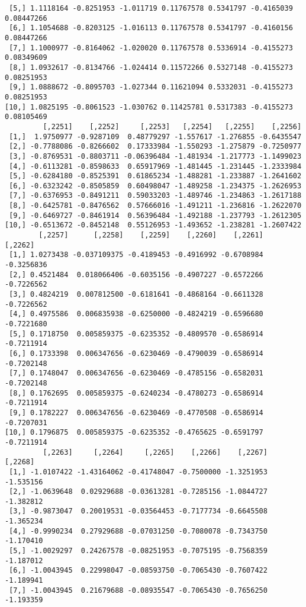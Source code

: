 \documentclass[
  letterpaper,
  DIV=11,
  numbers=noendperiod]{scrreprt}
\begin{document}
\begin{verbatim}
 [5,] 1.1118164 -0.8251953 -1.011719 0.11767578 0.5341797 -0.4165039 0.08447266
 [6,] 1.1054688 -0.8203125 -1.016113 0.11767578 0.5341797 -0.4160156 0.08447266
 [7,] 1.1000977 -0.8164062 -1.020020 0.11767578 0.5336914 -0.4155273 0.08349609
 [8,] 1.0932617 -0.8134766 -1.024414 0.11572266 0.5327148 -0.4155273 0.08251953
 [9,] 1.0888672 -0.8095703 -1.027344 0.11621094 0.5332031 -0.4155273 0.08251953
[10,] 1.0825195 -0.8061523 -1.030762 0.11425781 0.5317383 -0.4155273 0.08105469
         [,2251]    [,2252]     [,2253]   [,2254]   [,2255]    [,2256]
 [1,]  1.9750977 -0.9287109  0.48779297 -1.557617 -1.276855 -0.6435547
 [2,] -0.7788086 -0.8266602  0.17333984 -1.550293 -1.275879 -0.7250977
 [3,] -0.8769531 -0.8803711 -0.06396484 -1.481934 -1.217773 -1.1499023
 [4,] -0.6113281 -0.8598633  0.65917969 -1.481445 -1.231445 -1.2333984
 [5,] -0.6284180 -0.8525391  0.61865234 -1.488281 -1.233887 -1.2641602
 [6,] -0.6323242 -0.8505859  0.60498047 -1.489258 -1.234375 -1.2626953
 [7,] -0.6376953 -0.8491211  0.59033203 -1.489746 -1.234863 -1.2617188
 [8,] -0.6425781 -0.8476562  0.57666016 -1.491211 -1.236816 -1.2622070
 [9,] -0.6469727 -0.8461914  0.56396484 -1.492188 -1.237793 -1.2612305
[10,] -0.6513672 -0.8452148  0.55126953 -1.493652 -1.238281 -1.2607422
        [,2257]      [,2258]    [,2259]    [,2260]    [,2261]    [,2262]
 [1,] 1.0273438 -0.037109375 -0.4189453 -0.4916992 -0.6708984 -0.3256836
 [2,] 0.4521484  0.018066406 -0.6035156 -0.4907227 -0.6572266 -0.7226562
 [3,] 0.4824219  0.007812500 -0.6181641 -0.4868164 -0.6611328 -0.7226562
 [4,] 0.4975586  0.006835938 -0.6250000 -0.4824219 -0.6596680 -0.7221680
 [5,] 0.1718750  0.005859375 -0.6235352 -0.4809570 -0.6586914 -0.7211914
 [6,] 0.1733398  0.006347656 -0.6230469 -0.4790039 -0.6586914 -0.7202148
 [7,] 0.1748047  0.006347656 -0.6230469 -0.4785156 -0.6582031 -0.7202148
 [8,] 0.1762695  0.005859375 -0.6240234 -0.4780273 -0.6586914 -0.7211914
 [9,] 0.1782227  0.006347656 -0.6230469 -0.4770508 -0.6586914 -0.7207031
[10,] 0.1796875  0.005859375 -0.6235352 -0.4765625 -0.6591797 -0.7211914
         [,2263]     [,2264]     [,2265]    [,2266]    [,2267]   [,2268]
 [1,] -1.0107422 -1.43164062 -0.41748047 -0.7500000 -1.3251953 -1.535156
 [2,] -1.0639648  0.02929688 -0.03613281 -0.7285156 -1.0844727 -1.382812
 [3,] -0.9873047  0.20019531 -0.03564453 -0.7177734 -0.6645508 -1.365234
 [4,] -0.9990234  0.27929688 -0.07031250 -0.7080078 -0.7343750 -1.170410
 [5,] -1.0029297  0.24267578 -0.08251953 -0.7075195 -0.7568359 -1.187012
 [6,] -1.0043945  0.22998047 -0.08593750 -0.7065430 -0.7607422 -1.189941
 [7,] -1.0043945  0.21679688 -0.08935547 -0.7065430 -0.7656250 -1.193359

\end{verbatim}
\end{document}
